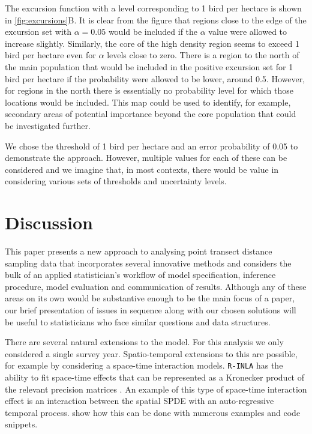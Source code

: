 \documentclass{stylefile16/statsoc}
\begin{document}
The excursion function with a level corresponding to 1 bird per hectare is shown in \autoref{fig:excursions}B.  It is clear from the figure that regions close to the edge of the excursion set with $\alpha = 0.05$ would be included if the $\alpha$ value were allowed to increase slightly.  Similarly, the core of the high density region seems to exceed 1 bird per hectare even for $\alpha$ levels close to zero.  There is a region to the north of the main population that would be included in the positive excursion set for 1 bird per hectare if the probability were allowed to be lower, around 0.5.  However, for regions in the north there is essentially no probability level for which those locations would be included.  This map could be used to identify, for example, secondary areas of potential importance beyond the core population that could be investigated further.

We chose the threshold of 1 bird per hectare and an error probability of 0.05 to demonstrate the approach.  However, multiple values for each of these can be considered and we imagine that, in most contexts, there would be value in considering various sets of thresholds and uncertainty levels.


\section{Discussion}
\label{sec-discussion}

This paper presents a new approach to analysing point transect distance sampling data that incorporates several innovative methods and considers the bulk of an applied statistician's workflow of model specification, inference procedure, model evaluation and communication of results.  Although any of these areas on its own would be substantive enough to be the main focus of a paper, our brief presentation of issues in sequence along with our chosen solutions will be useful to statisticians who face similar questions and data structures.

There are several natural extensions to the model.  For this analysis we only considered a single survey year.  Spatio-temporal extensions to this are possible, for example by considering a space-time interaction models.  \texttt{R-INLA} has the ability to fit space-time effects that can be represented as a Kronecker product of the relevant precision matrices \citep{blangiardo_spatial_2013, yuan_point_2017}.  An example of this type of space-time interaction effect is an interaction between the spatial SPDE with an auto-regressive temporal process.  \cite{blangiardo_spatial_2013} show how this can be done with numerous examples and code snippets.
\end{document}
